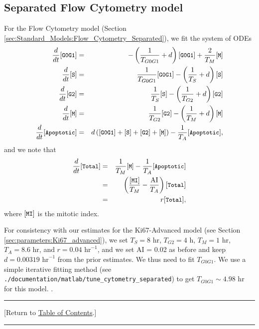 \documentclass[12pt]{article}
\newcommand{\beqa}{\begin{eqnarray}}
\newcommand{\eeqa}{\end{eqnarray}}
\renewcommand{\v}{\verb}
\renewcommand{\tt}[1]{{\small \left[\texttt{#1}\right] }}
\newcommand{\TOClink}{\begin{center}\hrule\vskip-5pt\phantom{.}\hfill[Return to \hyperlink{TOC}{Table of Contents}.]\hfill\phantom{.}\vskip3pt\hrule\end{center}}
\begin{document}
\subsection{Separated Flow Cytometry model}
\label{sec:parameters:flow_cytometry_separated}
For the Flow Cytometry model (Section \ref{sec:Standard_Models:Flow_Cytometry_Separated}), 
we fit the system of ODEs 
\beqa
\frac{d}{dt}\tt{G0G1} & = & -\left( \frac{1}{T_{G0G1}} + d \right) \tt{G0G1} + \frac{2}{T_{M}}\tt{M}  \\
\frac{d}{dt}\tt{S} & = & \frac{1}{T_{G0G1}} \tt{G0G1} - \left( \frac{1}{T_{S}} + d \right) \tt{S} \\
\frac{d}{dt}\tt{G2} & = &  \frac{1}{T_{S}} \tt{S} - \left( \frac{1}{T_{G2}} + d \right) \tt{G2} \\
\frac{d}{dt}\tt{M} & = &  \frac{1}{T_{G2}} \tt{G2} - \left( \frac{1}{T_{M}} + d \right) \tt{M} \\
\frac{d}{dt}\tt{Apoptotic} & = & d\left( \tt{G0G1} + \tt{S} + \tt{G2} + \tt{M} \right) -\frac{1}{T_A} \tt{Apoptotic}, 
\eeqa
and we note that 
\beqa
\frac{d}{dt}\tt{Total} 
& = & \frac{1}{T_{M}} \tt{M} - \frac{1}{T_A} \tt{Apoptotic} \nonumber \\ 
& = & \left( \frac{\tt{MI}}{T_{M}}  - \frac{\textrm{AI}}{T_A} \right) \tt{Total} \nonumber \\ 
& = & r \tt{Total},
\eeqa
where $\tt{MI}$ is the mitotic index. 

For consistency with our estimates for the Ki67-Advanced model (see Section \ref{sec:parameters:Ki67_advanced}), 
we set $T_{S} = 8$ hr, $T_{G2} = 4$ h, $T_{M} = 1$ hr, $T_A = 8.6$ hr, and 
$r = 0.04 \textrm{ hr}^{-1}$, and we set AI = 0.02 as before and keep 
$d = 0.00319 \textrm{ hr}^{-1}$ from the prior estimates. We thus need to fit  
$T_{G0G1}$. We use a simple iterative fitting method 
(see \v|./documentation/matlab/tune_cytometry_separated|) to get $T_{G0G1} \sim 4.98 \textrm{ hr}$ for this model. 
\cite{ref:Ki67_MCF10A}. 

\TOClink 




\end{document}
